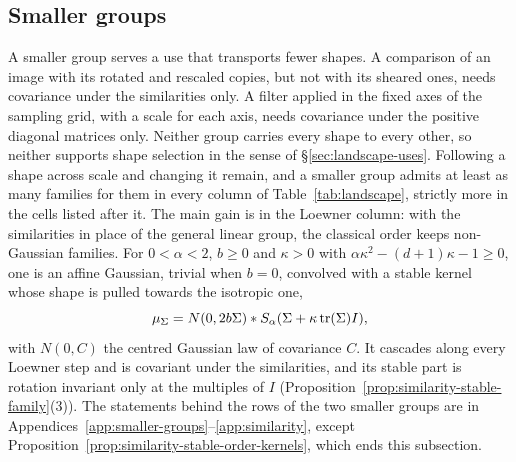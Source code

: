 
\subsection{Smaller groups}\label{sec:smaller-groups}

A smaller group serves a use that transports fewer shapes. A comparison of an image with its rotated
and rescaled copies, but not with its sheared ones, needs covariance under the similarities only. A
filter applied in the fixed axes of the sampling grid, with a scale for each axis, needs covariance
under the positive diagonal matrices only. Neither group carries every shape to every other, so
neither supports shape selection in the sense of \S\ref{sec:landscape-uses}. Following a shape across
scale and changing it remain, and a smaller group admits at least as many families for them in every
column of Table~\ref{tab:landscape}, strictly more in the cells listed after it. The main gain is in the Loewner column: with the
similarities in place of the general linear group, the classical order keeps non-Gaussian families.
For $0 < \alpha < 2$, $b \ge 0$ and $\kappa > 0$ with $\alpha\kappa^2 - (d+1)\kappa - 1 \ge 0$, one is an
affine Gaussian, trivial when $b = 0$, convolved with a stable kernel whose shape is pulled towards the
isotropic one,
\[
  \mu_\Sigma = N(0, 2b\Sigma) * S_\alpha(\Sigma + \kappa\operatorname{tr}(\Sigma)I) ,
\]
with $N(0, C)$ the centred Gaussian law of covariance $C$. It cascades along every Loewner step and is
covariant under the similarities, and its stable part is rotation invariant only at the multiples of
$I$ (Proposition~\ref{prop:similarity-stable-family}(3)). The statements behind the rows of the two
smaller groups are in Appendices~\ref{app:smaller-groups}--\ref{app:similarity}, except
Proposition~\ref{prop:similarity-stable-order-kernels}, which ends this subsection.

